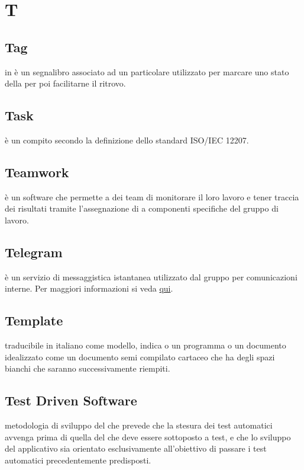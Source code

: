 \documentclass[12pt,a4paper]{article}
\begin{document}
\newpage

\section{T}


\subsection{Tag} 
in  è un segnalibro associato ad un particolare  utilizzato per marcare uno stato della  per poi facilitarne il ritrovo.

\subsection{Task} 
è un compito secondo la definizione dello standard ISO/IEC 12207.

\subsection{Teamwork} 
è un software che permette a dei team di monitorare il loro lavoro e tener traccia dei risultati tramite l'assegnazione di  a componenti specifiche del gruppo di lavoro.

\subsection{Telegram} 
è un servizio di messaggistica istantanea utilizzato dal gruppo per comunicazioni interne. Per maggiori informazioni si veda \href{https://it.wikipedia.org/wiki/Telegram_(software)}{qui}.

\subsection{Template} 
traducibile in italiano come modello, indica o un programma o un documento idealizzato come un documento semi compilato cartaceo che ha degli spazi bianchi che saranno successivamente riempiti.


\subsection{Test Driven Software} 
 metodologia di sviluppo del  che prevede che la stesura dei test automatici avvenga prima di quella del  che deve essere sottoposto a  test, e che lo sviluppo del  applicativo sia orientato esclusivamente all'obiettivo di passare i test automatici precedentemente predisposti.
\end{document}
